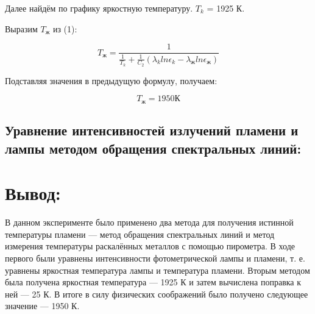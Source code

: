 \documentclass[a4paper]{article}
\begin{document}
Далее найдём по графику яркостную температуру. $T_k$ = 1925 К. \par

Выразим $T_\text{ж}$ из (1):

$$ T_\text{ж} = \frac{1}{ \frac{1}{T_k} + \frac{1}{C_2} (\lambda_k ln \epsilon_k - \lambda_\text{ж} ln \epsilon_\text{ж}) } $$

Подставляя значения в предыдущую формулу, получаем:

$$ T_\text{ж} = 1950 \text{К}$$ 

\subsection*{Уравнение интенсивностей излучений пламени и лампы методом обращения спектральных линий:}




\section*{Вывод:}
В данном эксперименте было применено два метода для получения истинной температуры пламени — метод обращения спектральных линий и метод измерения температуры раскалённых металлов с помощью пирометра. В ходе первого были уравнены интенсивности фотометрической лампы и пламени, т. е. уравнены яркостная температура лампы и температура пламени. Вторым методом была получена яркостная температура — 1925 К и затем вычислена поправка к ней — 25 К. В итоге в силу физических соображений было получено следующее значение —  1950 К.
\end{document}
